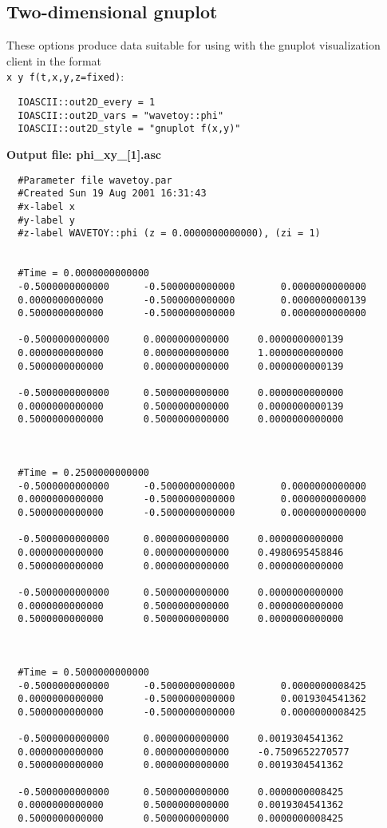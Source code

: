 \documentclass{article}
\begin{document}
\subsection{Two-dimensional gnuplot}

These options produce data suitable for using with the gnuplot visualization client in the format\\ {\tt x y f(t,x,y,z=fixed)}:

\begin{verbatim}
  IOASCII::out2D_every = 1
  IOASCII::out2D_vars = "wavetoy::phi"
  IOASCII::out2D_style = "gnuplot f(x,y)"
\end{verbatim}

\noindent
{\bf Output file: phi\_xy\_[1].asc}

\begin{verbatim}
  #Parameter file wavetoy.par
  #Created Sun 19 Aug 2001 16:31:43
  #x-label x
  #y-label y
  #z-label WAVETOY::phi (z = 0.0000000000000), (zi = 1)


  #Time = 0.0000000000000
  -0.5000000000000		-0.5000000000000		0.0000000000000
  0.0000000000000		-0.5000000000000		0.0000000000139
  0.5000000000000		-0.5000000000000		0.0000000000000

  -0.5000000000000		0.0000000000000		0.0000000000139
  0.0000000000000		0.0000000000000		1.0000000000000
  0.5000000000000		0.0000000000000		0.0000000000139

  -0.5000000000000		0.5000000000000		0.0000000000000
  0.0000000000000		0.5000000000000		0.0000000000139
  0.5000000000000		0.5000000000000		0.0000000000000



  #Time = 0.2500000000000
  -0.5000000000000		-0.5000000000000		0.0000000000000
  0.0000000000000		-0.5000000000000		0.0000000000000
  0.5000000000000		-0.5000000000000		0.0000000000000

  -0.5000000000000		0.0000000000000		0.0000000000000
  0.0000000000000		0.0000000000000		0.4980695458846
  0.5000000000000		0.0000000000000		0.0000000000000

  -0.5000000000000		0.5000000000000		0.0000000000000
  0.0000000000000		0.5000000000000		0.0000000000000
  0.5000000000000		0.5000000000000		0.0000000000000



  #Time = 0.5000000000000
  -0.5000000000000		-0.5000000000000		0.0000000008425
  0.0000000000000		-0.5000000000000		0.0019304541362
  0.5000000000000		-0.5000000000000		0.0000000008425

  -0.5000000000000		0.0000000000000		0.0019304541362
  0.0000000000000		0.0000000000000		-0.7509652270577
  0.5000000000000		0.0000000000000		0.0019304541362

  -0.5000000000000		0.5000000000000		0.0000000008425
  0.0000000000000		0.5000000000000		0.0019304541362
  0.5000000000000		0.5000000000000		0.0000000008425
\end{verbatim}
\end{document}
